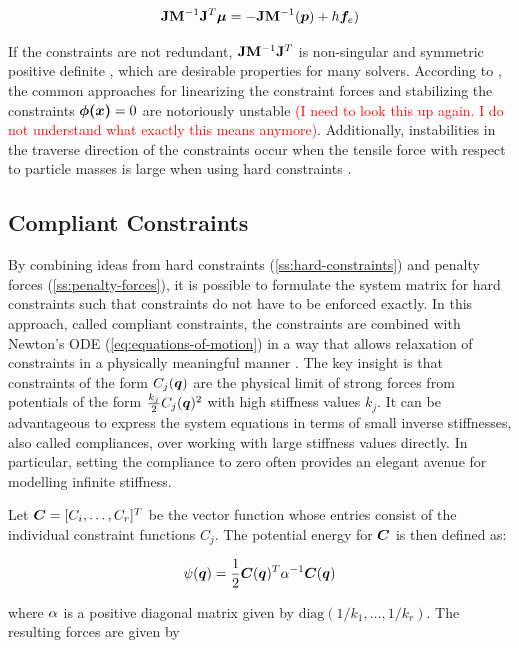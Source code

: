 \[
    \mathbf{J}\mathbf{M}^{-1}\mathbf{J}^T \bm{\mu} = -\mathbf{J}\mathbf{M}^{-1}(\bm{p}) + h \bm{f}_e)
\]

If the constraints are not redundant, $\mathbf{J}\mathbf{M}^{-1}\mathbf{J}^T$ is non-singular and symmetric positive definite \cite{baraff1996}, which are desirable
properties for many solvers. According to \cite{servin2006}, the common approaches for linearizing the constraint forces and stabilizing 
the constraints $\bm{\phi(x)} = 0$ are notoriously unstable \textcolor{red}{(I need to look this up again. I do not understand what exactly 
this means anymore)}. Additionally, instabilities in the traverse direction of the constraints occur when the tensile force with respect to 
particle masses is large when using hard constraints \cite{tournier2015}.

\subsection{Compliant Constraints}\label{ss:compliant-constraints}
By combining ideas from hard constraints (\cref{ss:hard-constraints}) and penalty forces (\cref{ss:penalty-forces}), it is possible to 
formulate the system matrix for hard constraints such that constraints do not have to be enforced exactly. In this approach, called compliant 
constraints, the constraints are combined with Newton's ODE (\cref{eq:equations-of-motion}) in a way that allows relaxation of constraints in a 
physically meaningful manner \cite{servin2006}. The key insight is that constraints 
of the form $C_j(\bm{q})$ are the physical limit of strong forces from potentials of the form $\frac{k_j}{2}C_j(\bm{q})^2$ with 
high stiffness values $k_j$. It can be advantageous to express the system equations in terms of small inverse stiffnesses, also 
called compliances, over working with large stiffness values directly. In particular, setting the compliance to zero often provides
an elegant avenue for modelling infinite stiffness. 

Let $\bm{C} = [C_i, \ldots, C_r]^T$ be the vector function whose entries consist of the individual constraint 
functions $C_j$. The potential energy for $\bm{C}$ is then defined as:

\begin{equation}\label{eq:compliant-potential}
    \psi(\bm{q}) = \frac{1}{2}\bm{C}(\bm{q})^T \mathbf{\alpha}^{-1}\bm{C}(\bm{q})
\end{equation}

\noindent where $\mathbf{\alpha}$ is a positive diagonal matrix given by $\text{diag}(1/k_1, \ldots, 1/k_r)$. The resulting forces are given by 

